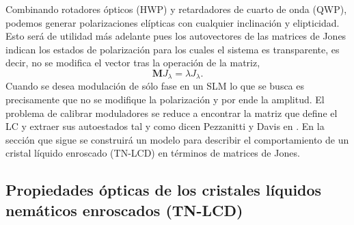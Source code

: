 Combinando rotadores ópticos (HWP) y retardadores de cuarto de onda (QWP),
podemos generar polarizaciones elípticas con cualquier inclinación y
elipticidad. Esto será de utilidad más adelante pues los autovectores
de las matrices de Jones indican los estados de polarización para los
cuales el sistema es transparente, es decir, no se modifica el vector
tras la operación de la matriz,
\[\mathbf{M}J_{\lambda} = \lambda J_{\lambda}.\]
Cuando se desea modulación de sólo fase en un SLM lo que se busca es
precisamente que no se modifique la polarización y por ende la
amplitud. El problema de calibrar moduladores se reduce a encontrar la
matriz que define el LC y extraer sus autoestados tal y como dicen
Pezzanitti y Davis en .
En la sección que sigue se construirá un modelo para describir el
comportamiento de un cristal líquido enroscado (TN-LCD) en términos de
matrices de Jones.

\subsection{Propiedades ópticas de los cristales líquidos nemáticos enroscados (TN-LCD)}

